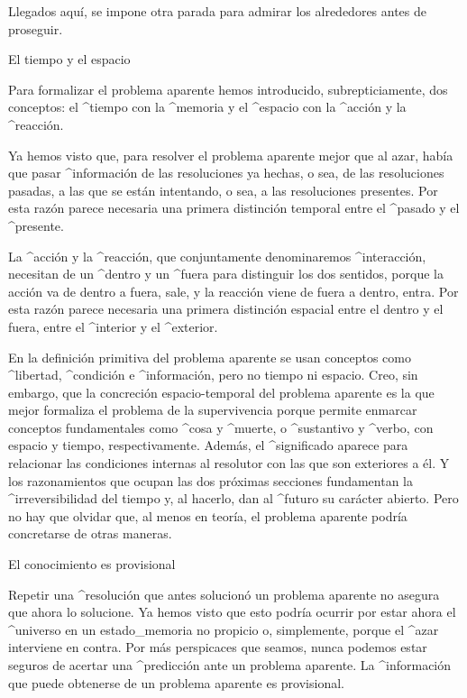 Llegados aquí, se impone otra parada para admirar los alrededores antes
de proseguir.


\Section El tiempo y el espacio

Para formalizar el problema aparente hemos introducido,
subrepticiamente, dos conceptos: el ^{tiempo} con la ^{memoria} y el
^{espacio} con la ^{acción} y la ^{reacción}.

Ya hemos visto que, para resolver el problema aparente mejor que al
azar, había que pasar ^{información} de las resoluciones ya hechas, o
sea, de las resoluciones pasadas, a las que se están intentando, o sea,
a las resoluciones presentes. Por esta razón parece necesaria una
primera distinción temporal entre el ^{pasado} y el ^{presente}.

La ^{acción} y la ^{reacción}, que conjuntamente denominaremos
^{interacción}, necesitan de un ^{dentro} y un ^{fuera} para distinguir
los dos sentidos, porque la acción va de dentro a fuera, sale, y la
reacción viene de fuera a dentro, entra. Por esta razón parece necesaria
una primera distinción espacial entre el dentro y el fuera, entre el
^{interior} y el ^{exterior}.

En la definición primitiva del problema aparente se usan conceptos como
^{libertad}, ^{condición} e ^{información}, pero no tiempo ni espacio.
Creo, sin embargo, que la concreción espacio-temporal del problema
aparente es la que mejor formaliza el problema de la supervivencia
porque permite enmarcar conceptos fundamentales como ^{cosa} y
^{muerte}, o ^{sustantivo} y ^{verbo}, con espacio y tiempo,
respectivamente. Además, el ^{significado} aparece para relacionar las
condiciones internas al resolutor con las que son exteriores a él. Y los
razonamientos que ocupan las dos próximas secciones fundamentan la
^{irreversibilidad} del tiempo y, al hacerlo, dan al ^{futuro} su
carácter abierto. Pero no hay que olvidar que, al menos en teoría, el
problema aparente podría concretarse de otras maneras.


\Section El conocimiento es provisional

Repetir una ^{resolución} que antes solucionó un problema aparente no
asegura que ahora lo solucione. Ya hemos visto que esto podría ocurrir
por estar ahora el ^{universo} en un estado_{memoria} no propicio o,
simplemente, porque el ^{azar} interviene en contra. Por más perspicaces
que seamos, nunca podemos estar seguros de acertar una ^{predicción}
ante un problema aparente. La ^{información} que puede obtenerse de un
problema aparente es provisional.

